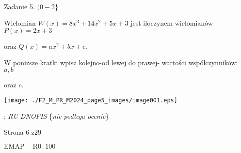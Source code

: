 \documentclass[a4paper,12pt]{article}
\begin{document}
Zadanie 5. $(0-2$\}

Wielomian $W(x)=8x^{3}+14x^{2}+5x+3$ jest iloczynem wielomianów $P(x)=2x+3$

oraz $Q(x)=ax^{2}+bx+c.$

$\mathrm{W}$ ponizsze kratki wpisz kolejno-od lewej do prawej- wartości wspólczynników: $a, b$

oraz $c.$
\begin{center}
\texttt{[image: ./F2\_M\_PR\_M2024\_page5\_images/image001.eps]}
\end{center}
: {\it RU DNOPIS} \{{\it nie podlega ocenie}\}

Strona 6 z29

$\mathrm{E}\mathrm{M}\mathrm{A}\mathrm{P}-\mathrm{R}0_{-}100$
\end{document}
